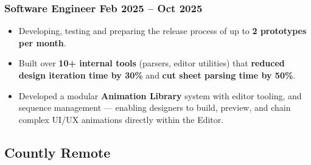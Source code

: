 \documentclass[11pt]{article}
\newcommand{\rside}[1]{
              \hfill {\normalfont\color{accent} #1}%
          }
\begin{document}
                                                                                      \subsubsection{Software Engineer \rside{Feb 2025 -- Oct 2025}}
                                                                                      \begin{itemize}
                                                                                                \item Developing, testing and preparing the release process of up to \textbf{2 prototypes per month}.
                                                                                                      \item Built over \textbf{10+ internal tools} (parsers, editor utilities) that \textbf{reduced design iteration time by 30\%} and \textbf{cut sheet parsing time by 50\%}.
                                                                                                            \item Developed a modular \textbf{Animation Library} system with editor tooling, and sequence management — enabling designers to build, preview, and chain complex UI/UX animations directly within the Editor.
                                                                                      \end{itemize}

                                                                                      \subsection{Countly \rside{Remote}}
\end{document}
